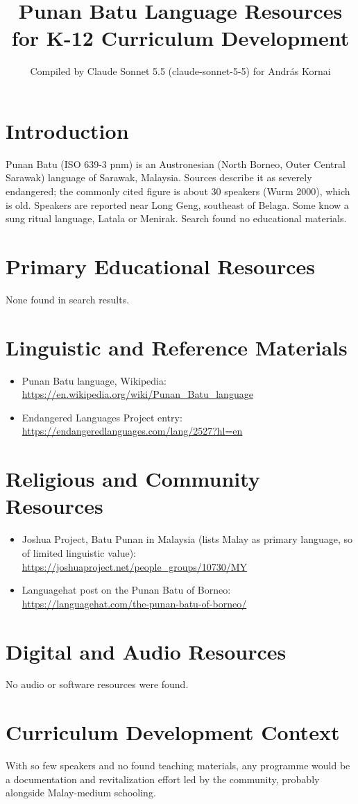 \documentclass[12pt]{article}
\title{Punan Batu Language Resources for K-12 Curriculum Development}
\author{Compiled by Claude Sonnet 5.5 (claude-sonnet-5-5) for Andr\'as Kornai}
\date{}
\begin{document}
\maketitle

\section{Introduction}
Punan Batu (ISO 639-3 pnm) is an Austronesian (North Borneo, Outer Central Sarawak) language of Sarawak, Malaysia. Sources describe it as severely endangered; the commonly cited figure is about 30 speakers (Wurm 2000), which is old. Speakers are reported near Long Geng, southeast of Belaga. Some know a sung ritual language, Latala or Menirak. Search found no educational materials.

\section{Primary Educational Resources}
None found in search results.

\section{Linguistic and Reference Materials}
\begin{itemize}
\item Punan Batu language, Wikipedia: \url{https://en.wikipedia.org/wiki/Punan_Batu_language}
\item Endangered Languages Project entry: \url{https://endangeredlanguages.com/lang/2527?hl=en}
\end{itemize}

\section{Religious and Community Resources}
\begin{itemize}
\item Joshua Project, Batu Punan in Malaysia (lists Malay as primary language, so of limited linguistic value): \url{https://joshuaproject.net/people_groups/10730/MY}
\item Languagehat post on the Punan Batu of Borneo: \url{https://languagehat.com/the-punan-batu-of-borneo/}
\end{itemize}

\section{Digital and Audio Resources}
No audio or software resources were found.

\section{Curriculum Development Context}
With so few speakers and no found teaching materials, any programme would be a documentation and revitalization effort led by the community, probably alongside Malay-medium schooling.
\end{document}
